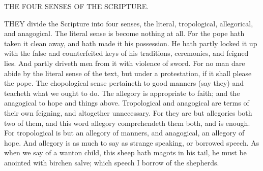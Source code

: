THE FOUR SENSES OF THE SCRIPTURE. 

THEY divide the Scripture into four senses, the literal, 
tropological, allegorical, and anagogical. The literal 
sense is become nothing at all. For the pope hath taken 
it clean away, and hath made it his possession. He hath 
partly locked it up with the false and counterfeited keys 
of his traditions, ceremonies, and feigned lies. And partly 
driveth men from it with violence of sword. For no man 
dare abide by the literal sense of the text, but under a 
protestation, if it shall please the pope. The chopological
sense pertaineth to good manners (say they) and 
teacheth what we ought to do. The allegory is appropriate
to faith; and the anagogical to hope and things 
above. Tropological and anagogical are terms of their 
own feigning, and altogether unnecessary. For they are 
but allegories both two of them, and this word allegory 
comprehendeth them both, and is enough. For tropological
is but an allegory of manners, and anagogical, an 
allegory of hope. And allegory is as much to say as
strange speaking, or borrowed speech. As when we say
of a wanton child, this sheep hath magots in his tail, he 
must be anointed with birchen salve; which speech I 
borrow of the shepherds. 

